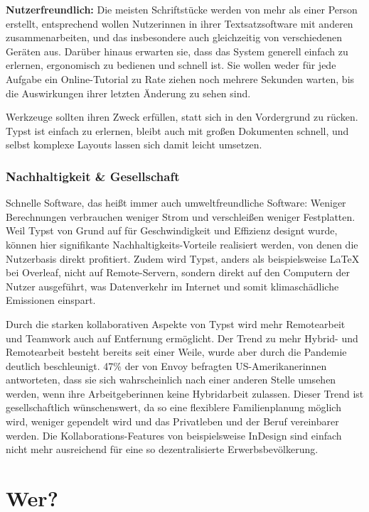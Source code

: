 \documentclass[11pt, a4paper]{article}
\newcommand{\gender}{\raisebox{-.25em}{*}}
\let\oldsection\section
\renewcommand\section{\clearpage\oldsection}
\newcommand{\cited}[1]{\marginsymbol{$\nearrow$ #1}}
\newcommand{\marginsymbol}[1] {\protect\marginsymbolhelper{#1}}
\newcommand{\marginsymbolhelper}[1] {\tabto*{-1cm}\makebox[0cm]{#1}\tabto*{\TabPrevPos}}
\begin{document}
\textbf{Nutzerfreundlich:} Die meisten Schriftstücke werden von mehr als einer Person erstellt, entsprechend wollen Nutzer\gender{}innen in ihrer Textsatzsoftware mit anderen zusammenarbeiten, und das insbesondere auch gleichzeitig von verschiedenen Geräten aus. Darüber hinaus erwarten sie, dass das System generell einfach zu erlernen, ergonomisch zu bedienen und schnell ist. Sie wollen weder für jede Aufgabe ein Online-Tutorial zu Rate ziehen noch mehrere Sekunden warten, bis die Auswirkungen ihrer letzten Änderung zu sehen sind.

Werkzeuge sollten ihren Zweck erfüllen, statt sich in den Vordergrund zu rücken. Typst ist einfach zu erlernen, bleibt auch mit großen Dokumenten schnell, und selbst komplexe Layouts lassen sich damit leicht umsetzen.

\subsubsection*{Nachhaltigkeit \& Gesellschaft}

Schnelle Software, das heißt immer auch umweltfreundliche Software: Weniger Berechnungen verbrauchen weniger Strom und verschleißen weniger Festplatten. Weil Typst von Grund auf für Geschwindigkeit und Effizienz designt wurde, können hier signifikante Nachhaltigkeits-Vorteile realisiert werden, von denen die Nutzerbasis direkt profitiert. Zudem wird Typst, anders als beispielsweise LaTeX bei Overleaf,  nicht auf Remote-Servern, sondern direkt auf den Computern der Nutzer ausgeführt, was Datenverkehr im Internet und somit klimaschädliche Emissionen einspart.


Durch die starken kollaborativen Aspekte von Typst wird mehr Remotearbeit und Teamwork auch auf Entfernung ermöglicht. Der Trend zu mehr \cited{2} Hybrid- und Remotearbeit besteht bereits seit einer Weile, wurde aber durch die Pandemie deutlich beschleunigt. \cited{3} 47\% der von Envoy befragten US-Amerikaner\gender{}innen antworteten, dass sie sich wahrscheinlich nach einer anderen Stelle umsehen werden, wenn ihr\gender{}e Arbeitgeber\gender{}innen keine Hybridarbeit zulassen. Dieser Trend ist gesellschaftlich wünschenswert, da so eine flexiblere Familienplanung möglich wird, weniger gependelt wird und das Privatleben und der Beruf vereinbarer werden. Die Kollaborations-Features von beispielsweise InDesign sind einfach nicht mehr ausreichend für eine so dezentralisierte Erwerbsbevölkerung.

\section*{Wer?}
\end{document}
